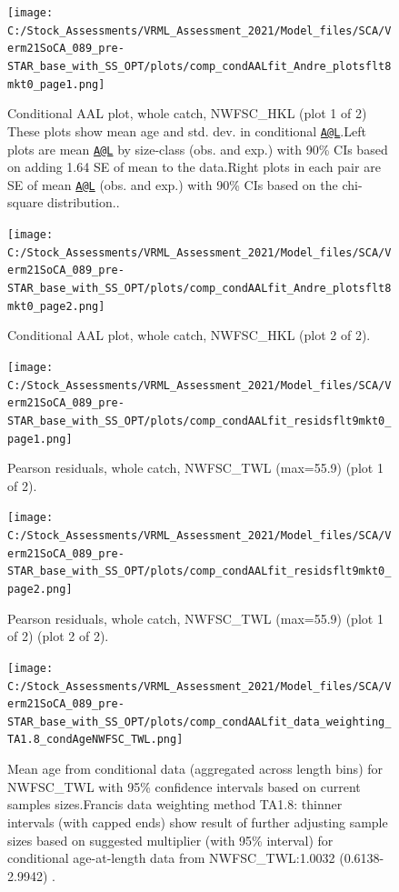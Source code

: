 \documentclass[11pt,
  english,
  a4paper,
]{article}
\begin{document}
\begin{figure}
\centering
\texttt{[image: C:/Stock\_Assessments/VRML\_Assessment\_2021/Model\_files/SCA/Verm21SoCA\_089\_pre-STAR\_base\_with\_SS\_OPT/plots/comp\_condAALfit\_Andre\_plotsflt8mkt0\_page1.png]}
\caption{Conditional AAL plot, whole catch, NWFSC\_HKL (plot 1 of 2) These plots show mean age and std. dev. in conditional {\href{mailto:A@L}{\nolinkurl{A@L}}\leavevmode\tagmcend\tagstructend}.Left plots are mean {\href{mailto:A@L}{\nolinkurl{A@L}}\leavevmode\tagmcend\tagstructend} by size-class (obs. and exp.) with 90\% CIs based on adding 1.64 SE of mean to the data.Right plots in each pair are SE of mean {\href{mailto:A@L}{\nolinkurl{A@L}}\leavevmode\tagmcend\tagstructend} (obs. and exp.) with 90\% CIs based on the chi-square distribution..\label{fig:comp_condAALfit_Andre_plotsflt8mkt0_page1}}
\end{figure}

\begin{figure}
\centering
\texttt{[image: C:/Stock\_Assessments/VRML\_Assessment\_2021/Model\_files/SCA/Verm21SoCA\_089\_pre-STAR\_base\_with\_SS\_OPT/plots/comp\_condAALfit\_Andre\_plotsflt8mkt0\_page2.png]}
\caption{Conditional AAL plot, whole catch, NWFSC\_HKL (plot 2 of 2).\label{fig:comp_condAALfit_Andre_plotsflt8mkt0_page2}}
\end{figure}

\begin{figure}
\centering
\texttt{[image: C:/Stock\_Assessments/VRML\_Assessment\_2021/Model\_files/SCA/Verm21SoCA\_089\_pre-STAR\_base\_with\_SS\_OPT/plots/comp\_condAALfit\_residsflt9mkt0\_page1.png]}
\caption{Pearson residuals, whole catch, NWFSC\_TWL (max=55.9) (plot 1 of 2).\label{fig:comp_condAALfit_residsflt9mkt0_page1}}
\end{figure}

\begin{figure}
\centering
\texttt{[image: C:/Stock\_Assessments/VRML\_Assessment\_2021/Model\_files/SCA/Verm21SoCA\_089\_pre-STAR\_base\_with\_SS\_OPT/plots/comp\_condAALfit\_residsflt9mkt0\_page2.png]}
\caption{Pearson residuals, whole catch, NWFSC\_TWL (max=55.9) (plot 1 of 2) (plot 2 of 2).\label{fig:comp_condAALfit_residsflt9mkt0_page2}}
\end{figure}

\begin{figure}
\centering
\texttt{[image: C:/Stock\_Assessments/VRML\_Assessment\_2021/Model\_files/SCA/Verm21SoCA\_089\_pre-STAR\_base\_with\_SS\_OPT/plots/comp\_condAALfit\_data\_weighting\_TA1.8\_condAgeNWFSC\_TWL.png]}
\caption{Mean age from conditional data (aggregated across length bins) for NWFSC\_TWL with 95\% confidence intervals based on current samples sizes.Francis data weighting method TA1.8: thinner intervals (with capped ends) show result of further adjusting sample sizes based on suggested multiplier (with 95\% interval) for conditional age-at-length data from NWFSC\_TWL:1.0032 (0.6138-2.9942) .\label{fig:comp_condAALfit_data_weighting_TA1.8_condAgeNWFSC_TWL}}
\end{figure}
\end{document}
